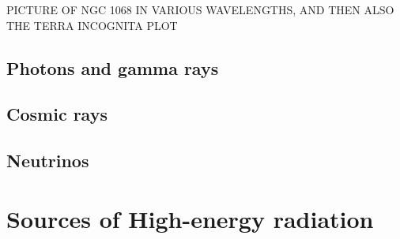 PICTURE OF NGC 1068 IN VARIOUS WAVELENGTHS, AND THEN ALSO THE TERRA INCOGNITA PLOT



\subsection{Photons and gamma rays}
\label{sec:intro:gammarays}


\subsection{Cosmic rays}
\label{sec:intro:cosmicrays}

\subsection{Neutrinos}
\label{sec:intro:neutrinos}

\section{Sources of High-energy radiation}

